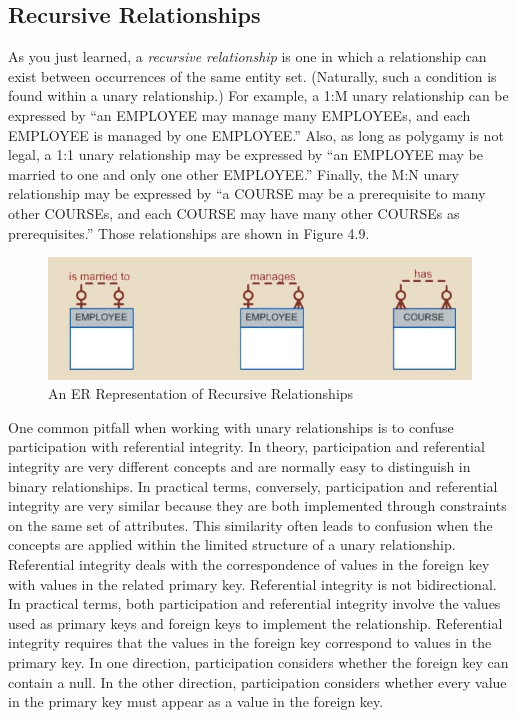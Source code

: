 \documentclass[a4paper, 12pt, titlepage]{report}
\begin{document}
{\subsection{Recursive Relationships}
As you just learned, a \emph{recursive relationship} is one in which a relationship can exist between occurrences of the same entity set. (Naturally, such a condition is found within a unary relationship.) For example, a 1:M unary relationship can be expressed by “an EMPLOYEE may manage many EMPLOYEEs, and each EMPLOYEE is managed by one EMPLOYEE.” Also, as long as polygamy is not legal, a 1:1 unary relationship may be expressed by “an EMPLOYEE may be married to one and only one other EMPLOYEE.” Finally, the M:N unary relationship may be expressed by “a COURSE may be a prerequisite to many other COURSEs, and each COURSE may have many other COURSEs as prerequisites.” Those relationships are shown in Figure 4.9.
\begin{figure}[H]
\centering
\includegraphics[scale=0.6]{Recur}
\caption{An ER Representation of Recursive Relationships}
\end{figure}
\noindent One common pitfall when working with unary relationships is to confuse participation with referential integrity. In theory, participation and referential integrity are very different concepts and are normally easy to distinguish in binary relationships. In practical terms, conversely, participation and referential integrity are very similar because they are both implemented through constraints on the same set of attributes. This similarity often leads to confusion when the concepts are applied within the limited structure of a unary relationship. Referential integrity deals with the correspondence of values in the foreign key with values in the related primary key. Referential integrity is not bidirectional. In practical terms, both participation and referential integrity involve the values used as primary keys and foreign keys to implement the relationship. Referential integrity requires that the values in the foreign key correspond to values in the primary key. In one direction, participation considers whether the foreign key can contain a null. In the other direction, participation considers whether every value in the primary key must appear as a value in the foreign key.
}
\end{document}
